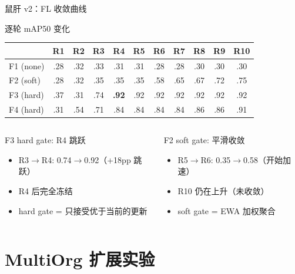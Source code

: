 \documentclass[aspectratio=169, 10pt]{beamer}
\begin{document}
\begin{frame}{鼠肝 v2：FL 收敛曲线}
  \begin{block}{逐轮 mAP50 变化}
    \begin{tabular}{lcccccccccc}
      \toprule
      & R1 & R2 & R3 & R4 & R5 & R6 & R7 & R8 & R9 & R10 \\
      \midrule
      F1 (none) & .28 & .32 & .33 & .31 & .31 & .28 & .28 & .30 & .30 & .30 \\
      F2 (soft) & .28 & .32 & .35 & .35 & .35 & .58 & .65 & .67 & .72 & .75 \\
      F3 (hard) & .37 & .31 & .74 & \textbf{.92} & .92 & .92 & .92 & .92 & .92 & .92 \\
      F4 (hard) & .31 & .54 & .71 & .84 & .84 & .84 & .84 & .86 & .86 & .91 \\
      \bottomrule
    \end{tabular}
  \end{block}
  \vspace{0em}
  \begin{columns}[T]
    \begin{alertblock}{F3 hard gate: R4 跳跃}
      \begin{itemize}
        \item R3$\to$R4: 0.74$\to$0.92（+18pp 跳跃）
        \item R4 后完全冻结
        \item hard gate = 只接受优于当前的更新
      \end{itemize}
    \end{alertblock}
    \begin{block}{F2 soft gate: 平滑收敛}
      \begin{itemize}
        \item R5$\to$R6: 0.35$\to$0.58（开始加速）
        \item R10 仍在上升（未收敛）
        \item soft gate = EWA 加权聚合
      \end{itemize}
    \end{block}
  \end{columns}
\end{frame}

\section{MultiOrg 扩展实验}
\end{document}
